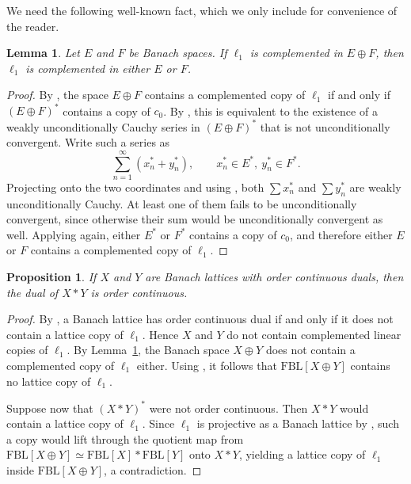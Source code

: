 \documentclass[12pt]{amsart}
\newcommand{\FBL}{\mathrm{FBL}}
\theoremstyle{plain}
\newtheorem{lemma}[theorem]{Lemma}
\newtheorem{proposition}[theorem]{Proposition}
\theoremstyle{definition}
\begin{document}
We need the following well-known fact, which we only include for convenience of the reader.

\begin{lemma}\label{lem:comp-l1}
Let $E$ and $F$ be Banach spaces. If $\ell_1$ is complemented in $E\oplus F$, then $\ell_1$ is complemented in either $E$ or $F$.
\end{lemma}

\begin{proof}
By \cite[Theorem~10]{diestel}, the space $E\oplus F$ contains a complemented copy of $\ell_1$ if and only if $(E\oplus F)^*$ contains a copy of $c_0$. By \cite[Theorem~2.4.11]{albiackalton}, this is equivalent to the existence of a weakly unconditionally Cauchy series in $(E\oplus F)^*$ that is not unconditionally convergent. Write such a series as
\[
\sum_{n=1}^\infty (x_n^*+y_n^*),
\qquad x_n^*\in E^*,\ y_n^*\in F^*.
\]
Projecting onto the two coordinates and using \cite[Proposition~2.4.7]{albiackalton}, both $\sum x_n^*$ and $\sum y_n^*$ are weakly unconditionally Cauchy. At least one of them fails to be unconditionally convergent, since otherwise their sum would be unconditionally convergent as well. Applying \cite[Theorem~2.4.11]{albiackalton} again, either $E^*$ or $F^*$ contains a copy of $c_0$, and therefore either $E$ or $F$ contains a complemented copy of $\ell_1$.
\end{proof}

\begin{proposition}
If $X$ and $Y$ are Banach lattices with order continuous duals, then the dual of $X\ast Y$ is order continuous.
\end{proposition} 

\begin{proof}
By \cite[Theorem~4.69]{burkinshaw}, a Banach lattice has order continuous dual if and only if it does not contain a lattice copy of $\ell_1$. Hence $X$ and $Y$ do not contain complemented linear copies of $\ell_1$. By Lemma~\ref{lem:comp-l1}, the Banach space $X\oplus Y$ does not contain a complemented copy of $\ell_1$ either. Using \cite[Theorem~9.20]{freebanlat}, it follows that $\FBL[X\oplus Y]$ contains no lattice copy of $\ell_1$.

Suppose now that $(X\ast Y)^*$ were not order continuous. Then $X\ast Y$ would contain a lattice copy of $\ell_1$. Since $\ell_1$ is projective as a Banach lattice by \cite[Theorem~11.11]{projfree}, such a copy would lift through the quotient map from $\FBL[X\oplus Y]\simeq \FBL[X]\ast \FBL[Y]$ onto $X\ast Y$, yielding a lattice copy of $\ell_1$ inside $\FBL[X\oplus Y]$, a contradiction.
\end{proof}
\end{document}
